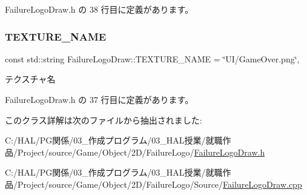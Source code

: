  Failure\+Logo\+Draw.\+h の 38 行目に定義があります。

\mbox{\label{class_failure_logo_draw_a287b81d9dcab4be17a88d9aff7c97a9a}} 
\subsubsection{\texorpdfstring{T\+E\+X\+T\+U\+R\+E\+\_\+\+N\+A\+ME}{TEXTURE\_NAME}}
{\footnotesize\ttfamily const std\+::string Failure\+Logo\+Draw\+::\+T\+E\+X\+T\+U\+R\+E\+\_\+\+N\+A\+ME = \char`\"{}UI/Game\+Over.\+png\char`\"{}\hspace{0.3cm}{\ttfamily [static]}, {\ttfamily [private]}}



テクスチャ名 



 Failure\+Logo\+Draw.\+h の 37 行目に定義があります。



このクラス詳解は次のファイルから抽出されました\+:\begin{DoxyCompactItemize}
\item 
C\+:/\+H\+A\+L/\+P\+G関係/03\+\_\+作成プログラム/03\+\_\+\+H\+A\+L授業/就職作品/\+Project/source/\+Game/\+Object/2\+D/\+Failure\+Logo/\mbox{\hyperlink{_failure_logo_draw_8h}{Failure\+Logo\+Draw.\+h}}\item 
C\+:/\+H\+A\+L/\+P\+G関係/03\+\_\+作成プログラム/03\+\_\+\+H\+A\+L授業/就職作品/\+Project/source/\+Game/\+Object/2\+D/\+Failure\+Logo/\+Source/\mbox{\hyperlink{_failure_logo_draw_8cpp}{Failure\+Logo\+Draw.\+cpp}}\end{DoxyCompactItemize}
